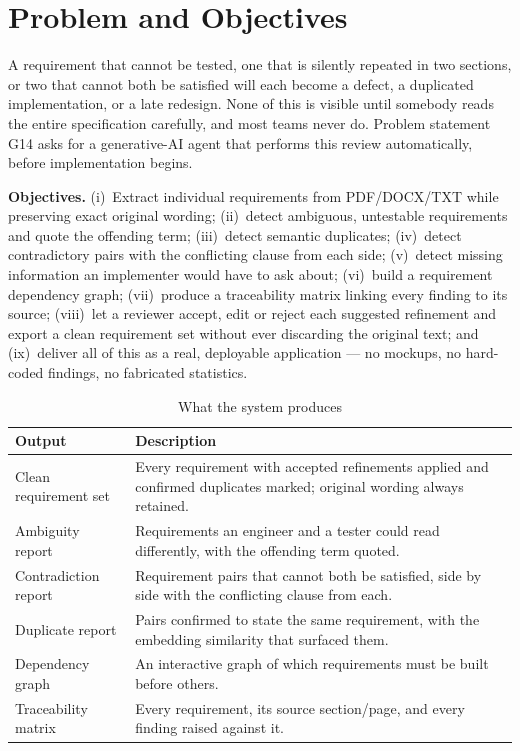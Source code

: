 \section{Problem and Objectives}

A requirement that cannot be tested, one that is silently repeated in two
sections, or two that cannot both be satisfied will each become a defect, a
duplicated implementation, or a late redesign. None of this is visible until
somebody reads the entire specification carefully, and most teams never do.
Problem statement G14 asks for a generative-AI agent that performs this review
automatically, before implementation begins.

\textbf{Objectives.} (i)~Extract individual requirements from PDF/DOCX/TXT while
preserving exact original wording; (ii)~detect ambiguous, untestable
requirements and quote the offending term; (iii)~detect semantic duplicates;
(iv)~detect contradictory pairs with the conflicting clause from each side;
(v)~detect missing information an implementer would have to ask about;
(vi)~build a requirement dependency graph; (vii)~produce a traceability matrix
linking every finding to its source; (viii)~let a reviewer accept, edit or
reject each suggested refinement and export a clean requirement set without
ever discarding the original text; and (ix)~deliver all of this as a real,
deployable application --- no mockups, no hard-coded findings, no fabricated
statistics.

\begin{table}[h!]
\centering\small
\begin{tabular}{@{}p{3.1cm} p{12.3cm}@{}}
\toprule
\textbf{Output} & \textbf{Description} \\
\midrule
Clean requirement set & Every requirement with accepted refinements applied and confirmed duplicates marked; original wording always retained. \\
Ambiguity report & Requirements an engineer and a tester could read differently, with the offending term quoted. \\
Contradiction report & Requirement pairs that cannot both be satisfied, side by side with the conflicting clause from each. \\
Duplicate report & Pairs confirmed to state the same requirement, with the embedding similarity that surfaced them. \\
Dependency graph & An interactive graph of which requirements must be built before others. \\
Traceability matrix & Every requirement, its source section/page, and every finding raised against it. \\
\bottomrule
\end{tabular}
\caption{What the system produces}
\end{table}

